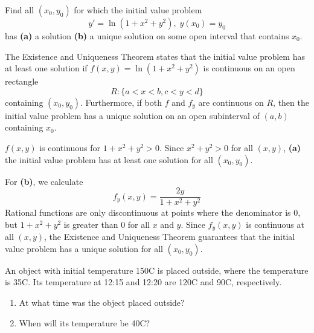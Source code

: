 \documentclass[11pt, titlepage]{article}
\begin{document}
  \pagebreak

  \begin{problem}[Trench 2.3.7]
    Find all \((x_{0}, y_{0})\) for which the initial value problem
    \begin{equation*}
      y' = \ln(1 + x^{2} + y^{2}), \; y(x_{0}) = y_{0}
    \end{equation*}
    has \textbf{(a)} a solution \textbf{(b)} a unique solution on some open interval that contains \(x_{0}\).
  \end{problem}

  \begin{solution}
    The Existence and Uniqueness Theorem states that the initial value problem has at least one solution if
    \(f(x, y) = \ln(1 + x^{2} + y^{2})\) is continuous on an open rectangle
    \begin{equation*}
      R : \{a < x < b, c < y < d\}
    \end{equation*}
    containing \((x_{0}, y_{0})\).
    Furthermore, if both \(f\) and \(f_{y}\) are continuous on \(R\), then the initial value problem has a unique solution on an open subinterval of \((a, b)\) containing \(x_{0}\).

    \(f(x, y)\) is continuous for \(1 + x^{2} + y^{2} > 0\). Since \(x^{2} + y^{2} > 0\) for all \((x, y)\), \textbf{(a)} the initial value problem has at least one solution for all \((x_{0}, y_{0})\).

    For \textbf{(b)}, we calculate
    \begin{equation*}
      f_{y}(x, y) = \frac{2y}{1 + x^{2} + y^{2}}
    \end{equation*}
    Rational functions are only discontinuous at points where the denominator is 0, but \(1 + x^{2} + y^{2}\) is greater than 0 for all \(x\) and \(y\).
    Since \(f_{y}(x, y)\) is continuous at all \((x, y)\), the Existence and Uniqueness Theorem guarantees that the initial value problem has a unique solution for all \((x_{0}, y_{0})\).
  \end{solution}

  \pagebreak

  \begin{problem}[Trench 4.2.5]
    An object with initial temperature 150\degree C is placed outside, where the temperature is 35\degree C.
    Its temperature at 12:15 and 12:20 are 120\degree C and 90\degree C, respectively.
    \begin{enumerate}
      \item At what time was the object placed outside?
      \item When will its temperature be 40\degree C?
    \end{enumerate}
  \end{problem}
\end{document}
